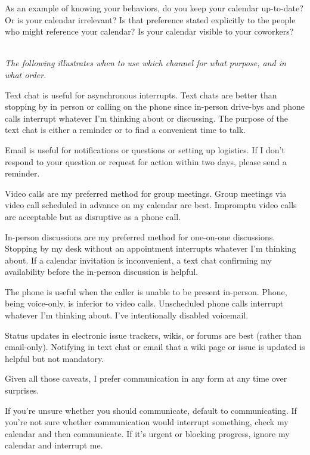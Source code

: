 As an example of knowing your behaviors, do you keep your calendar up-to-date? Or is your calendar irrelevant? Is that preference stated explicitly to the people who might reference your calendar? Is your calendar visible to your coworkers?

\ \\

\textit{The following illustrates when to use which channel for what purpose, and in what order.} 

Text chat is useful for asynchronous interrupts. Text chats are better than stopping by in person or calling on the phone since in-person drive-bys and phone calls interrupt whatever I'm thinking about or discussing. The purpose of the text chat is either a reminder or to find a convenient time to talk. 

Email is useful for notifications or questions or setting up logistics. If I don't respond to your question or request for action within two days, please send a reminder. 

Video calls are my preferred method for group meetings. Group meetings via video call scheduled in advance on my calendar are best. Impromptu video calls are acceptable but as disruptive as a phone call. 

In-person discussions are my preferred method for one-on-one discussions. Stopping by my desk  without an appointment interrupts whatever I'm thinking about. If a calendar invitation is inconvenient, a text chat confirming my availability before the in-person discussion is helpful. 

The phone is useful when the caller is unable to be present in-person. Phone, being voice-only, is inferior to video calls. Unscheduled phone calls interrupt whatever I'm thinking about. I've intentionally disabled voicemail. 

Status updates in electronic issue trackers, wikis, or forums are best (rather than email-only). Notifying in text chat or email that a wiki page or issue is updated is helpful but not mandatory. 

Given all those caveats, I prefer communication in any form at any time over surprises. 

If you're unsure whether you should communicate, default to communicating. If you're not sure whether communication would interrupt something, check my calendar and then communicate. If it's urgent or blocking progress, ignore my calendar and interrupt me. 

\ \\

